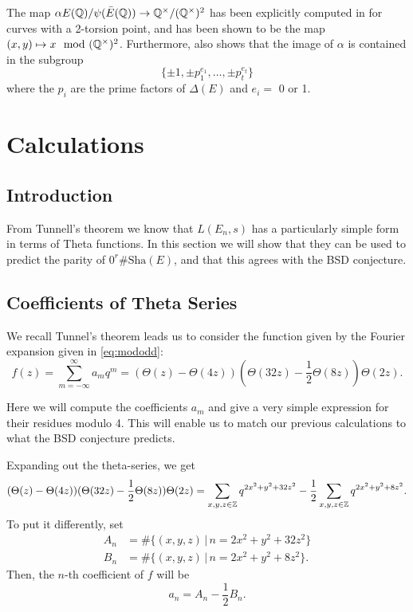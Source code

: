 \documentclass[12pt, a4paper]{amsart}
\begin{document}
\begin{remark}
  The map $\alpha E({\mathbb Q}) / \psi(\bar{E}({\mathbb Q})) \rightarrow {\mathbb Q}^\times / ({\mathbb Q}^\times)^2$ has been
  explicitly computed in \cite{rational} for curves with a 2-torsion point, and
  has been shown to be the map $(x,y) \mapsto x \mod ({\mathbb Q}^\times)^2$.
  Furthermore, \cite{rational} also shows that the image of $\alpha$ is
  contained in the subgroup
  \[\{\pm 1, \pm p_1^{e_1}, \dots, \pm p_t^{e_t} \}\]
  where the $p_i$ are the prime factors of $\Delta(E)$ and $e_i =$ 0 or 1.
\end{remark}


\section{Calculations}

\subsection{Introduction}

From Tunnell's theorem we know that $L(E_n,s)$ has a particularly simple
form in terms of Theta functions. In this section we will show that they
can be used to predict the parity of $0^r \#\text{Sha}(E)$, and that
this agrees with the BSD conjecture.


\subsection{Coefficients of Theta Series}
We recall Tunnel's theorem leads us to consider the function given by the
Fourier expansion given in \autoref{eq:mododd}:
\[
  f(z) = \sum\limits_{m=-\infty}^\infty a_m q^m
  = (\Theta(z) - \Theta(4z)) \left(\Theta(32z)-\frac{1}{2} \Theta(8z)\right) \Theta(2z).
\]

Here we will compute the coefficients $a_m$ and give a very simple expression for
their residues modulo 4. This will enable us to match our previous calculations
to what the BSD conjecture predicts.

Expanding out the theta-series, we get
\[
    (\Theta(z) - \Theta(4z)) (\Theta(32z)-\frac{1}{2} \Theta(8z)) \Theta(2z)
    = \sum\limits_{x, y, z \in {\mathbb Z}} q^{2x^2+y^2+32z^2} - \frac{1}{2}
    \sum\limits_{x,y,z \in {\mathbb Z}} q^{2x^2+y^2+8z^2}.
\]
To put it differently, set
\begin{equation*}
  \begin{split}
    A_n &= \#\{(x,y,z) \,|\, n = 2x^2 + y^2 + 32z^2\} \\
    B_n &= \#\{(x,y,z) \,|\, n = 2x^2 + y^2 + 8z^2\}.
  \end{split}
\end{equation*}
Then, the $n$-th coefficient of $f$ will be
\[a_n = A_n - \frac{1}{2}B_n.\]
\end{document}
